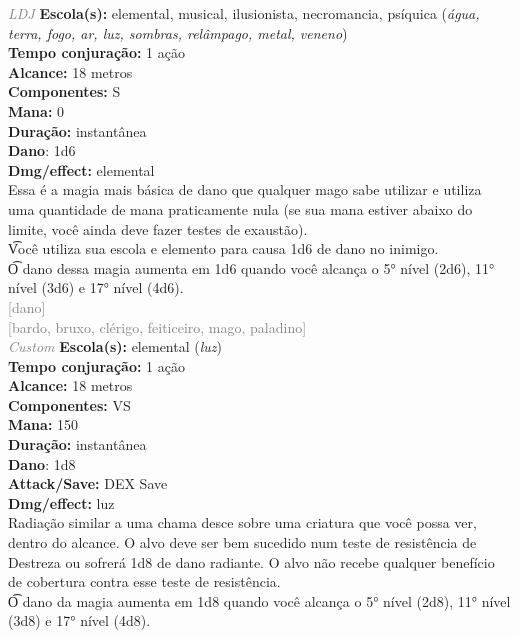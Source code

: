 \documentclass{RPG_Adventure}[2021/10/20]
\begin{document}
{\tiny \textcolor{gray}{\textit{LDJ}}}
{\small \t \textbf{Escola(s):} elemental, musical, ilusionista, necromancia, psíquica (\textit{água, terra, fogo, ar, luz, sombras, relâmpago, metal, veneno})\\\t \textbf{Tempo conjuração:} 1 ação\\\t \textbf{Alcance:} 18 metros\\\t \textbf{Componentes:} S\\\t \textbf{Mana:} 0\\\t \textbf{Duração:} instantânea\\\t \textbf{Dano}: 1d6\\\t \textbf{Dmg/effect:} elemental\\}
{\normalsize Essa é a magia mais básica de dano que qualquer mago sabe utilizar e utiliza uma quantidade de mana praticamente nula (se sua mana estiver abaixo do limite, você ainda deve fazer testes de exaustão).\\\t Você utiliza sua escola e elemento para causa 1d6 de dano no inimigo.\\\t O dano dessa magia aumenta em 1d6 quando você alcança o 5° nível (2d6), 11° nível (3d6) e 17° nível (4d6).\\}
{\scriptsize \textcolor{gray}{[dano]\\}}
{\scriptsize \textcolor{gray}{[bardo, bruxo, clérigo, feiticeiro, mago, paladino]\\}}
{\tiny \textcolor{gray}{\textit{Custom}}}
{\small \t \textbf{Escola(s):} elemental (\textit{luz})\\\t \textbf{Tempo conjuração:} 1 ação\\\t \textbf{Alcance:} 18 metros\\\t \textbf{Componentes:} VS\\\t \textbf{Mana:} 150\\\t \textbf{Duração:} instantânea\\\t \textbf{Dano}: 1d8\\\t \textbf{Attack/Save:} DEX Save\\\t \textbf{Dmg/effect:} luz\\}
{\normalsize Radiação similar a uma chama desce sobre uma criatura que você possa ver, dentro do alcance. O alvo deve ser bem sucedido num teste de resistência de Destreza ou sofrerá 1d8 de dano radiante. O alvo não recebe qualquer benefício de cobertura contra esse teste de resistência.\\\t O dano da magia aumenta em 1d8 quando você alcança o 5° nível (2d8), 11° nível (3d8) e 17° nível (4d8).\\}
\end{document}
